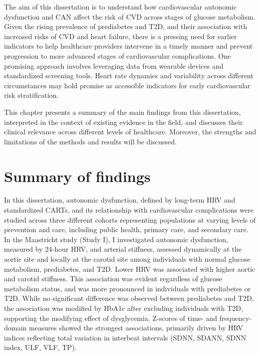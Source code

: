 \documentclass[
  a4paper,
  headsepline=true,
  open=any]{scrbook}
\begin{document}
The aim of this dissertation is to understand how cardiovascular
autonomic dysfunction and CAN affect the risk of CVD across stages of
glucose metabolism. Given the rising prevalence of prediabetes and T2D,
and their association with increased risks of CVD and heart failure,
there is a pressing need for earlier indicators to help healthcare
providers intervene in a timely manner and prevent progression to more
advanced stages of cardiovascular complications. One promising approach
involves leveraging data from wearable devices and standardized
screening tools. Heart rate dynamics and variability across different
circumstances may hold promise as accessible indicators for early
cardiovascular risk stratification.

This chapter presents a summary of the main findings from this
dissertation, interpreted in the context of existing evidence in the
field, and discusses their clinical relevance across different levels of
healthcare. Moreover, the strengths and limitations of the methods and
results will be discussed.

\newpage

\hypertarget{summary-of-findings}{%
\section{Summary of findings}\label{summary-of-findings}}

In this dissertation, autonomic dysfunction, defined by long-term HRV
and standardized CARTs, and its relationship with cardiovascular
complications were studied across three different cohorts representing
populations at varying levels of prevention and care, including public
health, primary care, and secondary care. In the Maastricht study (Study
I), I investigated autonomic dysfunction, measured by 24-hour HRV, and
arterial stiffness, assessed dynamically at the aortic site and locally
at the carotid site among individuals with normal glucose metabolism,
prediabetes, and T2D. Lower HRV was associated with higher aortic and
carotid stiffness. This association was evident regardless of glucose
metabolism status, and was more pronounced in individuals with
prediabetes or T2D. While no significant difference was observed between
prediabetes and T2D, the association was modified by HbA1c after
excluding individuals with T2D, supporting the modifying effect of
dysglycemia. Z-scores of time- and frequency-domain measures showed the
strongest associations, primarily driven by HRV indices reflecting total
variation in interbeat intervals (SDNN, SDANN, SDNN index, ULF, VLF,
TP).
\end{document}
